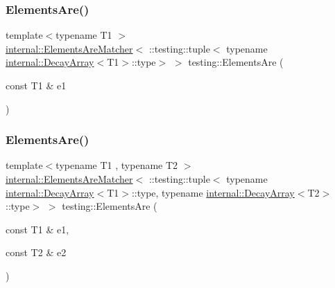 \mbox{\label{namespacetesting_aa35aa6c9638d989e9f4aaa6009f60589}} 
\subsubsection{\texorpdfstring{Elements\+Are()}{ElementsAre()}\hspace{0.1cm}{\footnotesize\ttfamily [2/11]}}
{\footnotesize\ttfamily template$<$typename T1 $>$ \\
\hyperlink{classtesting_1_1internal_1_1_elements_are_matcher}{internal\+::\+Elements\+Are\+Matcher}$<$ \+::testing\+::tuple$<$ typename \hyperlink{structtesting_1_1internal_1_1_decay_array}{internal\+::\+Decay\+Array}$<$T1$>$\+::type$>$ $>$ testing\+::\+Elements\+Are (\begin{DoxyParamCaption}\item[{const T1 \&}]{e1 }\end{DoxyParamCaption})\hspace{0.3cm}{\ttfamily [inline]}}

\mbox{\label{namespacetesting_a864f77fe7774308d4c54f1f52f9040cf}} 
\subsubsection{\texorpdfstring{Elements\+Are()}{ElementsAre()}\hspace{0.1cm}{\footnotesize\ttfamily [3/11]}}
{\footnotesize\ttfamily template$<$typename T1 , typename T2 $>$ \\
\hyperlink{classtesting_1_1internal_1_1_elements_are_matcher}{internal\+::\+Elements\+Are\+Matcher}$<$ \+::testing\+::tuple$<$ typename \hyperlink{structtesting_1_1internal_1_1_decay_array}{internal\+::\+Decay\+Array}$<$T1$>$\+::type, typename \hyperlink{structtesting_1_1internal_1_1_decay_array}{internal\+::\+Decay\+Array}$<$T2$>$\+::type$>$ $>$ testing\+::\+Elements\+Are (\begin{DoxyParamCaption}\item[{const T1 \&}]{e1,  }\item[{const T2 \&}]{e2 }\end{DoxyParamCaption})\hspace{0.3cm}{\ttfamily [inline]}}

